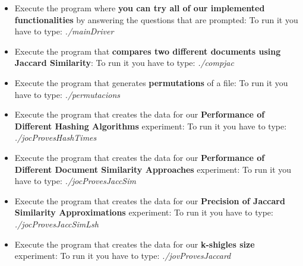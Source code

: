 \documentclass[12pt]{article}
\begin{document}
   \begin{itemize}
   
   \item Execute the program where \textbf{you can try all of our implemented functionalities} by answering the questions that are prompted:
   To run it you have to type: \textit{./mainDriver}
   
           \item Execute the program that \textbf{compares two different documents using Jaccard Similarity}:
   To run it you have to type: \textit{./compjac}
  

   \item Execute the program that generates \textbf{permutations} of a file:
   To run it you have to type: \textit{./permutacions}
    
\item Execute the program that creates the data for our \textbf{Performance of Different Hashing Algorithms} experiment:
   To run it you have to type: \textit{./jocProvesHashTimes}
  
\item Execute the program that creates the data for our \textbf{Performance of Different Document Similarity Approaches} experiment:
   To run it you have to type: \textit{./jocProvesJaccSim}
   \item Execute the program that creates the data for our \textbf{Precision of Jaccard Similarity Approximations} experiment:
   To run it you have to type: \textit{./jocProvesJaccSimLsh}
   
      \item Execute the program that creates the data for our \textbf{k-shigles size} experiment:
   To run it you have to type: \textit{./jovProvesJaccard}

   
      \end{itemize}
\end{document}

